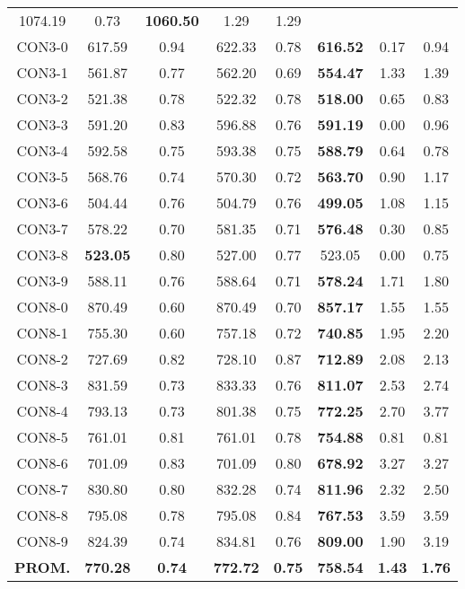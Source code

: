 \begin{table}[ht]
\begin{tabular}{c c c c c c c c}
1074.19 & 0.73 & \bf{1060.50} & 
1.29 & 1.29\\CON3-0 & 617.59 & 0.94 & 
622.33 & 0.78 & \bf{616.52} & 
0.17 & 0.94\\CON3-1 & 561.87 & 0.77 & 
562.20 & 0.69 & \bf{554.47} & 
1.33 & 1.39\\CON3-2 & 521.38 & 0.78 & 
522.32 & 0.78 & \bf{518.00} & 
0.65 & 0.83\\CON3-3 & 591.20 & 0.83 & 
596.88 & 0.76 & \bf{591.19} & 
0.00 & 0.96\\CON3-4 & 592.58 & 0.75 & 
593.38 & 0.75 & \bf{588.79} & 
0.64 & 0.78\\CON3-5 & 568.76 & 0.74 & 
570.30 & 0.72 & \bf{563.70} & 
0.90 & 1.17\\CON3-6 & 504.44 & 0.76 & 
504.79 & 0.76 & \bf{499.05} & 
1.08 & 1.15\\CON3-7 & 578.22 & 0.70 & 
581.35 & 0.71 & \bf{576.48} & 
0.30 & 0.85\\CON3-8 & \bf{523.05} & 0.80 & 
527.00 & 0.77 & 523.05 & 0.00
 & 0.75\\CON3-9 & 588.11 & 0.76 & 
588.64 & 0.71 & \bf{578.24} & 
1.71 & 1.80\\CON8-0 & 870.49 & 0.60 & 
870.49 & 0.70 & \bf{857.17} & 
1.55 & 1.55\\CON8-1 & 755.30 & 0.60 & 
757.18 & 0.72 & \bf{740.85} & 
1.95 & 2.20\\CON8-2 & 727.69 & 0.82 & 
728.10 & 0.87 & \bf{712.89} & 
2.08 & 2.13\\CON8-3 & 831.59 & 0.73 & 
833.33 & 0.76 & \bf{811.07} & 
2.53 & 2.74\\CON8-4 & 793.13 & 0.73 & 
801.38 & 0.75 & \bf{772.25} & 
2.70 & 3.77\\CON8-5 & 761.01 & 0.81 & 
761.01 & 0.78 & \bf{754.88} & 
0.81 & 0.81\\CON8-6 & 701.09 & 0.83 & 
701.09 & 0.80 & \bf{678.92} & 
3.27 & 3.27\\CON8-7 & 830.80 & 0.80 & 
832.28 & 0.74 & \bf{811.96} & 
2.32 & 2.50\\CON8-8 & 795.08 & 0.78 & 
795.08 & 0.84 & \bf{767.53} & 
3.59 & 3.59\\CON8-9 & 824.39 & 0.74 & 
834.81 & 0.76 & \bf{809.00} & 
1.90 & 3.19\\\bf{PROM.} & 
\bf{770.28} & \bf{0.74} & \bf{772.72} & \bf{0.75} & \bf{758.54} & \bf{1.43} & \bf{1.76}\\[1ex]\hline
\end{tabular}
\label{table:nonlin}
\end{table} 
\clearpage
